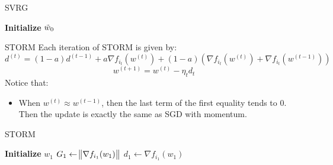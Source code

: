 \documentclass[10pt]{beamer}
\begin{document}
\begin{frame}{SVRG}
    \begin{algorithm}[H]
        \DontPrintSemicolon
        \SetAlgoNoLine

        \textbf{Initialize} $\Tilde{w}_0$\;
        \caption{{\textsc{SVRG Procedure}}}
        \label{algo:svrg}
    \end{algorithm}
\end{frame}

\begin{frame}{STORM}
    Each iteration of STORM is given by:
    $$d^{(t)} = (1-a)d^{(t-1)} + a\nabla f_{i_t}(w^{(t)}) + (1-a)(\nabla f_{i_t}(w^{(t)}) +  \nabla f_{i_t}(w^{(t-1)}))$$
    $$w^{(t+1)} = w^{(t)} - \eta_t d_t$$
    Notice that:
    \begin{itemize}
        \item When $w^{(t)} \approx w^{(t-1)}$, then the last term of the first equality tends to 0. Then the update is exactly the same as SGD with momentum. 
    \end{itemize}
\end{frame}

\begin{frame}{STORM}
    \begin{algorithm}[H]
        \DontPrintSemicolon
        \SetAlgoNoLine

        \textbf{Initialize} $w_1$\;
        $G_1 \gets \norm {\nabla f_{i_1}(w_1)}$\;
        $d_1 \gets \nabla f_{i_1}(w_1)$\;
        \caption{{\textsc{STORM Procedure}}}
        \label{algo:storm}
    \end{algorithm}
\end{frame}
\end{document}
